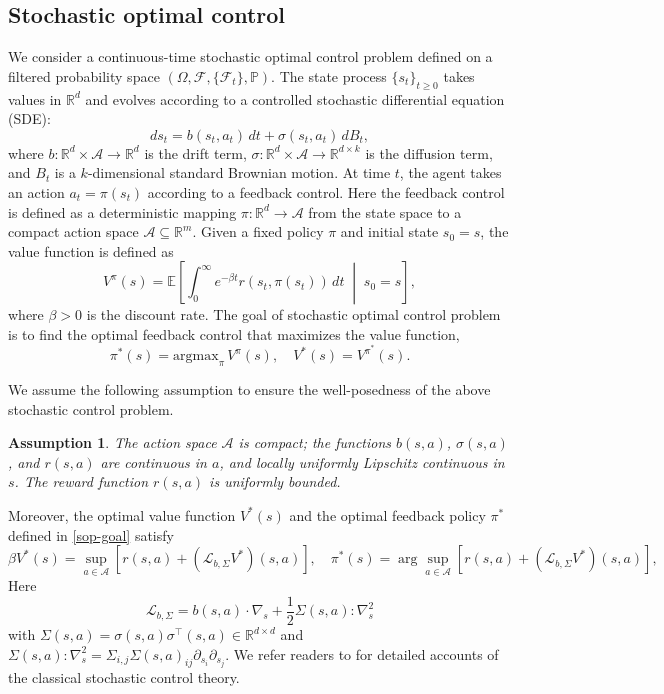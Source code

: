 \documentclass[12pt]{article}
\newtheorem{assumption}{Assumption}
\def\R{\mathbb R}
\def\mL{\mathcal{L}_{b,\Sigma}}
\def\mA{\mathcal A}
\def\argmax{\text{argmax}}
\begin{document}
\subsection{Stochastic optimal control}
We consider a continuous-time stochastic optimal control problem defined on a filtered probability space $(\Omega, \mathcal{F}, \{\mathcal{F}_t\}, \mathbb{P})$. The state process $\{s_t\}_{t \ge 0}$ takes values in $\mathbb{R}^d$ and evolves according to a controlled stochastic differential equation (SDE):
\begin{equation}\label{dyn}
    ds_t = b(s_t, a_t)\, dt + \sigma(s_t, a_t)\, dB_t,
\end{equation}
where $b: \mathbb{R}^d \times \mathcal{A} \to \mathbb{R}^d$ is the drift term, $\sigma: \mathbb{R}^d \times \mathcal{A} \to \mathbb{R}^{d \times k}$ is the diffusion term, and $B_t$ is a $k$-dimensional standard Brownian motion.  
At time $t$, the agent takes an action $a_t =\pi(s_t)$ according to a feedback control. Here the feedback control is defined as a deterministic mapping 
$\pi : \mathbb{R}^d \to \mathcal{A}$ from the state space to a compact action space $\mathcal{A} \subseteq \mathbb{R}^m$.  
Given a fixed policy $\pi$ and initial state $s_0 = s$, the value function is defined as
\begin{equation}\label{def of V-pi}
    V^\pi(s) = \mathbb{E}\left[ \int_0^\infty e^{-\beta t} r(s_t, \pi(s_t))\, dt \;\middle|\; s_0 = s \right],    
\end{equation}
where $\beta > 0$ is the discount rate. The goal of stochastic optimal control problem is to find the optimal feedback control that maximizes the value function,
\begin{equation}\label{sop-goal}
    \pi^*(s) = \argmax_\pi\, V^\pi(s), \quad V^*(s) = V^{\pi^*}(s).
\end{equation}

We assume the following assumption to ensure the well-posedness of the above stochastic control problem. 
\begin{assumption}\label{ass}
The action space $\mA$ is compact; the functions $b(s,a)$, $\sigma(s,a)$, and $r(s,a)$ are continuous in $a$, and locally uniformly Lipschitz continuous in $s$. The reward function $r(s,a)$ is uniformly bounded.
\end{assumption}
Moreover, the optimal value function $V^*(s)$ and the optimal feedback policy $\pi^*$ defined in \eqref{sop-goal}  satisfy
\[
\beta V^*(s) = \sup_{a\in\mA}[r(s,a) + (\mL V^*)(s,a)],\quad 
\pi^*(s) = \arg\sup_{a\in\mA}[r(s,a) + (\mL V^*)(s,a)],
\]
Here
\begin{equation}
\mL = b(s,a)\cdot \nabla_s + \frac{1}{2}\Sigma(s,a) :\nabla_s^2\label{eq:PE}
\end{equation}
with $\Sigma(s,a) = \sigma(s,a)\sigma^\top(s,a) \in \R^{d\times d}$ and $\Sigma(s,a) : \nabla_s^2 = \Sigma_{i,j}\Sigma(s,a)_{ij}\partial_{s_i}\partial_{s_j}$. We refer readers to \citep{FS06, YZ99, P09} for detailed accounts of the classical stochastic control theory.
\end{document}
